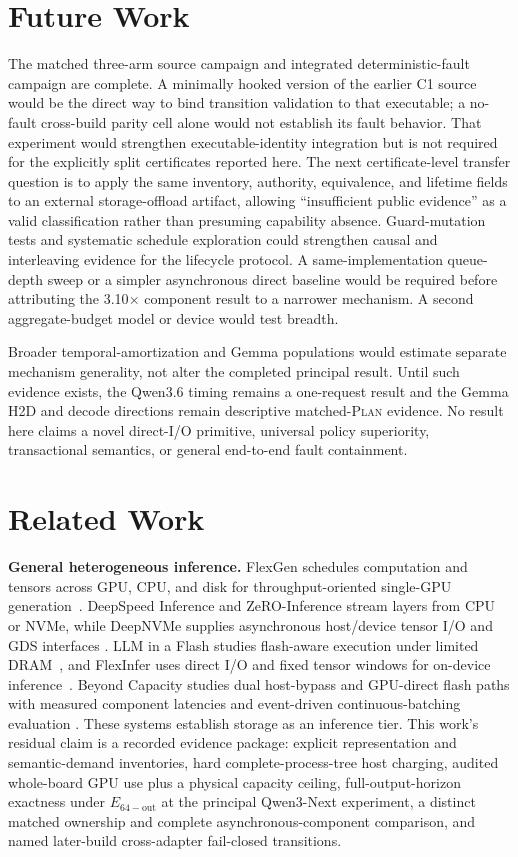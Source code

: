 \documentclass[letterpaper,twocolumn,10pt]{article}
\newcommand{\Plan}{\textsc{Plan}\xspace}
\newcommand{\para}[1]{\smallskip\noindent\textbf{#1.}}
\begin{document}
\section{Future Work}
\label{sec:prospective}

The matched three-arm source campaign and integrated deterministic-fault
campaign are complete.  A minimally hooked version of the earlier C1 source
would be the direct way to bind transition validation to that executable; a
no-fault cross-build parity cell alone would not establish its fault behavior.
That experiment would strengthen executable-identity integration but is not
required for the explicitly split certificates reported here.  The next
certificate-level transfer question is to apply the same inventory, authority,
equivalence, and lifetime fields to an external storage-offload artifact,
allowing ``insufficient public evidence'' as a valid classification rather than
presuming capability absence.  Guard-mutation tests and systematic schedule
exploration could strengthen causal and interleaving evidence for the lifecycle
protocol.  A same-implementation queue-depth sweep or a simpler asynchronous
direct baseline would be required before attributing the 3.10$\times$ component
result to a narrower mechanism.  A second aggregate-budget model or device
would test breadth.

Broader temporal-amortization and Gemma populations would estimate separate
mechanism generality, not alter the completed principal result.  Until such evidence
exists, the Qwen3.6 timing remains a one-request result and the Gemma H2D and
decode directions remain descriptive matched-\Plan evidence.  No result here
claims a novel direct-I/O primitive, universal policy superiority,
transactional semantics, or general end-to-end fault containment.

\section{Related Work}
\label{sec:related}

\para{General heterogeneous inference}
FlexGen schedules computation and tensors across GPU, CPU, and disk for
throughput-oriented single-GPU generation~\cite{flexgen}.  DeepSpeed Inference
and ZeRO-Inference stream layers from CPU or NVMe, while DeepNVMe supplies
asynchronous host/device tensor I/O and GDS interfaces
\cite{deepspeedinference,zeroinference,deepnvme}.  LLM in a Flash studies
flash-aware execution under limited DRAM~\cite{llminflash}, and FlexInfer uses
direct I/O and fixed tensor windows for on-device inference~\cite{flexinfer}.
Beyond Capacity studies dual host-bypass and GPU-direct flash paths with
measured component latencies and event-driven continuous-batching evaluation
\cite{beyondcapacity}.
These systems establish storage as an inference tier.  This work's residual
claim is a recorded evidence package: explicit representation and semantic-demand
inventories, hard complete-process-tree host charging, audited whole-board GPU
use plus a physical capacity ceiling, full-output-horizon exactness under
$E_{\mathrm{64-out}}$ at the principal Qwen3-Next experiment, a distinct matched ownership
and complete asynchronous-component comparison, and named later-build
cross-adapter fail-closed transitions.
\end{document}

